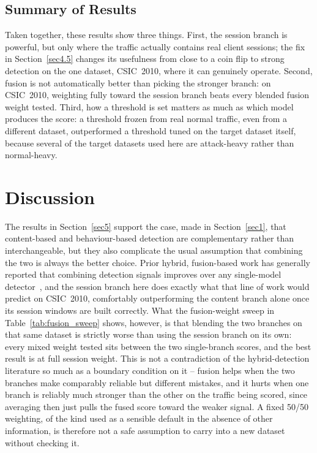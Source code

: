 \documentclass[futureinternet,article,submit,moreauthors]{Definitions/mdpi}
\begin{document}
\subsection{Summary of Results}

Taken together, these results show three things. First, the session branch is powerful, but only where the traffic actually contains real client sessions; the fix in Section~\ref{sec4.5} changes its usefulness from close to a coin flip to strong detection on the one dataset, CSIC~2010, where it can genuinely operate. Second, fusion is not automatically better than picking the stronger branch: on CSIC~2010, weighting fully toward the session branch beats every blended fusion weight tested. Third, how a threshold is set matters as much as which model produces the score: a threshold frozen from real normal traffic, even from a different dataset, outperformed a threshold tuned on the target dataset itself, because several of the target datasets used here are attack-heavy rather than normal-heavy.

\section{Discussion} \label{sec6}

The results in Section~\ref{sec5} support the case, made in Section~\ref{sec1}, that content-based and behaviour-based detection are complementary rather than interchangeable, but they also complicate the usual assumption that combining the two is always the better choice. Prior hybrid, fusion-based work has generally reported that combining detection signals improves over any single-model detector~\cite{kamal2025}, and the session branch here does exactly what that line of work would predict on CSIC~2010, comfortably outperforming the content branch alone once its session windows are built correctly. What the fusion-weight sweep in Table~\ref{tab:fusion_sweep} shows, however, is that blending the two branches on that same dataset is strictly worse than using the session branch on its own: every mixed weight tested sits between the two single-branch scores, and the best result is at full session weight. This is not a contradiction of the hybrid-detection literature so much as a boundary condition on it -- fusion helps when the two branches make comparably reliable but different mistakes, and it hurts when one branch is reliably much stronger than the other on the traffic being scored, since averaging then just pulls the fused score toward the weaker signal. A fixed 50/50 weighting, of the kind used as a sensible default in the absence of other information, is therefore not a safe assumption to carry into a new dataset without checking it.
\end{document}
